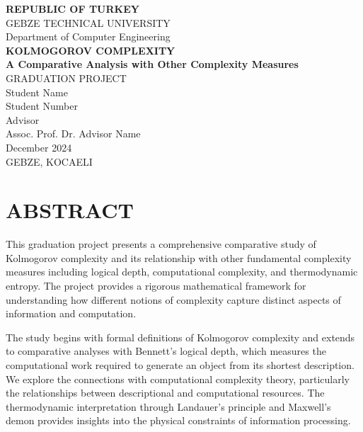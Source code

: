 \documentclass[12pt,a4paper]{report}
\begin{document}
\begin{titlepage}
    \centering
    \vspace*{2cm}
    {\Large \textbf{REPUBLIC OF TURKEY}\\
    GEBZE TECHNICAL UNIVERSITY\\
    \vspace{0.5cm}
    Department of Computer Engineering\\}
    \vfill
    {\huge \textbf{KOLMOGOROV COMPLEXITY}\\
    \vspace{0.5cm}
    \Large \textbf{A Comparative Analysis with Other Complexity Measures}\\}
    \vfill
    {\Large GRADUATION PROJECT\\}
    \vspace{1cm}
    {\large Student Name\\
    Student Number\\}
    \vspace{1cm}
    {\large Advisor\\
    Assoc. Prof. Dr. Advisor Name\\}
    \vspace{2cm}
    {\large December 2024\\
    GEBZE, KOCAELI}
\end{titlepage}

\setcounter{page}{1}

\chapter*{ABSTRACT}

This graduation project presents a comprehensive comparative study of Kolmogorov complexity and its relationship with other fundamental complexity measures including logical depth, computational complexity, and thermodynamic entropy. The project provides a rigorous mathematical framework for understanding how different notions of complexity capture distinct aspects of information and computation.

The study begins with formal definitions of Kolmogorov complexity and extends to comparative analyses with Bennett's logical depth, which measures the computational work required to generate an object from its shortest description. We explore the connections with computational complexity theory, particularly the relationships between descriptional and computational resources. The thermodynamic interpretation through Landauer's principle and Maxwell's demon provides insights into the physical constraints of information processing.
\end{document}
